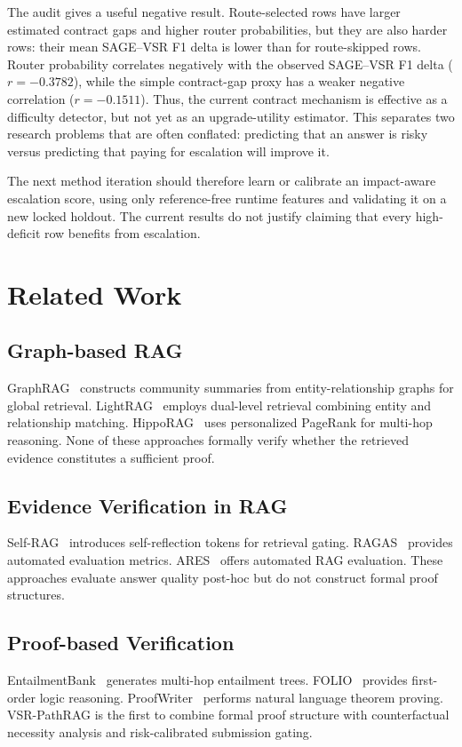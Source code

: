 \documentclass[journal,onecolumn,11pt]{IEEEtran}
\begin{document}
The audit gives a useful negative result. Route-selected rows have larger estimated contract gaps and higher router probabilities, but they are also harder rows: their mean SAGE--VSR F1 delta is lower than for route-skipped rows. Router probability correlates negatively with the observed SAGE--VSR F1 delta ($r=-0.3782$), while the simple contract-gap proxy has a weaker negative correlation ($r=-0.1511$). Thus, the current contract mechanism is effective as a difficulty detector, but not yet as an upgrade-utility estimator. This separates two research problems that are often conflated: predicting that an answer is risky versus predicting that paying for escalation will improve it.

The next method iteration should therefore learn or calibrate an impact-aware escalation score, using only reference-free runtime features and validating it on a new locked holdout. The current results do not justify claiming that every high-deficit row benefits from escalation.


\section{Related Work}

\subsection{Graph-based RAG}
GraphRAG~\cite{edge2024graphrag} constructs community summaries from entity-relationship graphs for global retrieval. LightRAG~\cite{guo2024lightrag} employs dual-level retrieval combining entity and relationship matching. HippoRAG~\cite{gutierrez2024hipporag} uses personalized PageRank for multi-hop reasoning. None of these approaches formally verify whether the retrieved evidence constitutes a sufficient proof.

\subsection{Evidence Verification in RAG}
Self-RAG~\cite{asai2023self} introduces self-reflection tokens for retrieval gating. RAGAS~\cite{es2023ragas} provides automated evaluation metrics. ARES~\cite{yan2024ares} offers automated RAG evaluation. These approaches evaluate answer quality post-hoc but do not construct formal proof structures.

\subsection{Proof-based Verification}
EntailmentBank~\cite{dalvi2021entailment} generates multi-hop entailment trees. FOLIO~\cite{han2022folio} provides first-order logic reasoning. ProofWriter~\cite{tafjord2021proofwriter} performs natural language theorem proving. VSR-PathRAG is the first to combine formal proof structure with counterfactual necessity analysis and risk-calibrated submission gating.
\end{document}
